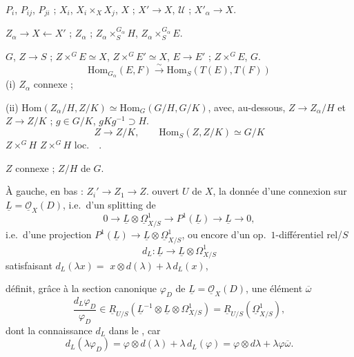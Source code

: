 \documentclass[11pt,a4paper]{article}
\begin{document}

$P_i$, $P_{ij}$, $P_{ji}$ ; $X_i$, $X_i \times_X X_j$, $X$ ; $X' \to X$, $\mathcal{U}$ ; $X'_\alpha \to X$.

$Z_\alpha \to X \leftarrow X'$ ; $Z_\alpha$ ; $Z_\alpha \times_S^{G_\alpha} H$, $Z_\alpha \times_S^{G_\alpha} E$.

$G$, $Z \to S$ ; $Z \times^G E \simeq X$, $Z \times^G E' \simeq X$, $E \to E'$ ; $Z \times^G E$, $G$.
\[
  \mathrm{Hom}_{G_\alpha}(E, F) \xrightarrow{\ \sim\ } \mathrm{Hom}_{S}(T(E), T(F))
\]
(i) $Z_\alpha$ connexe ;

(ii) $\mathrm{Hom}(Z_\alpha/H, Z/K) \simeq \mathrm{Hom}_G(G/H, G/K)$,
avec, au-dessous, $Z \to Z_\alpha/H$ et $Z \to Z/K$ ; $g \in G/K$, $gKg^{-1} \supset H$.
\[
  Z \longrightarrow Z/K, \qquad \mathrm{Hom}_S(Z, Z/K) \simeq G/K
\]
$Z \times^G H$ \struck{\ill{}}   $Z \times^G H$  loc.\ \ \ill{}.

$Z$ connexe ; $Z/H$  \ill{} de $G$.

À gauche, en bas : $Z_i' \to Z_1 \to Z$.
ouvert $U$ de $X$, la donnée d'une connexion sur $\underline{L} = \underline{\mathcal{O}}_X(D)$, i.e.\ d'un splitting de
\[
  0 \to \underline{L} \otimes \underline{\Omega}^1_{X/S} \to P^1(\underline{L}) \to \underline{L} \to 0,
\]
i.e.\ d'une projection $P^1(\underline{L}) \to \underline{L} \otimes \underline{\Omega}^1_{X/S}$, ou encore d'un op.\ $1$-différentiel rel/$S$
\[
  d_L : \underline{L} \to \underline{L} \otimes \Omega^1_{X/S}
\]
satisfaisant $d_L(\lambda x) =$ \struck{\ill{}} $x \otimes d(\lambda) + \lambda\, d_L(x)$,

 définit, grâce à la section  canonique $\varphi_D$ de $\underline{L} = \underline{\mathcal{O}}_X(D)$, une élément $\overline{\omega}$
\[
  \frac{d_L \varphi_D}{\varphi_D} \in \underline{R}_{U/S}(\underline{L}^{-1} \otimes \underline{L} \otimes \Omega^1_{X/S}) = \underline{R}_{U/S}(\underline{\Omega}^1_{X/S}),
\]
dont la connaissance  $d_L$ dans le , car 
\[
  d_L(\lambda \varphi_D) = \varphi \otimes d(\lambda) + \lambda\, d_L(\varphi) = \varphi \otimes d\lambda + \lambda \varphi \overline{\omega}.
\]
\end{document}
